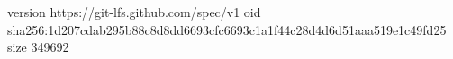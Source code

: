 version https://git-lfs.github.com/spec/v1
oid sha256:1d207cdab295b88c8d8dd6693cfc6693c1a1f44c28d4d6d51aaa519e1c49fd25
size 349692
